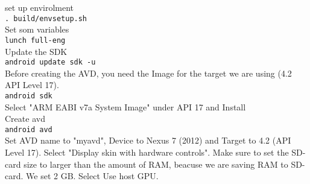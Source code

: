   set up envirolment\\
  \texttt{\justify . build/envsetup.sh} \\
  Set som variables\\
  \texttt{\justify lunch full-eng} \\
  Update the SDK\\
  \texttt{\justify android update sdk -u} \\
  Before creating the AVD, you need the Image for the target we are using (4.2 API Level 17).\\
  \texttt{\justify android sdk} \\
  Select "ARM EABI v7a System Image" under API 17 and Install\\
  Create avd\\
  \texttt{\justify android avd} \\
  Set AVD name to "myavd", Device to Nexus 7 (2012) and Target to 4.2 (API Level 17). Select "Display skin with hardware controls". 
  Make sure to set the SD-card size to larger than the amount of RAM, beacuse we are saving RAM to SD-card. 
  We set 2 GB. Select Use host GPU.\\
  
